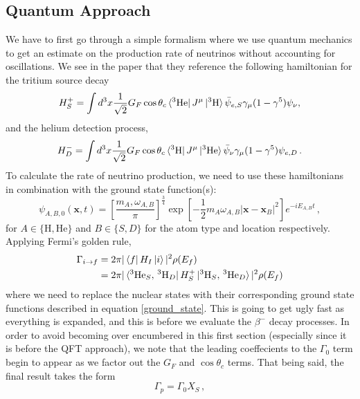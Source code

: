 \documentclass[10pt]{article}
\begin{document}
\subsection{Quantum Approach}
We have to first go through a simple formalism where we use quantum mechanics to get an estimate on the production rate of neutrinos without accounting for oscillations. We see in the paper that they reference the following hamiltonian for the tritium source decay
\begin{equation}
  H_{S}^{+} = \int d^{3}x\frac{1}{\sqrt{2}}G_{F}\cos\theta_{c}\bra{^{3}\textnormal{He}}J^{\mu}\ket{^{3}\textnormal{H}}\bar{\psi}_{e,S}\gamma_{\mu}(1-\gamma^{5})\psi_{\nu},
\end{equation}
and the helium detection process,
\begin{equation}
  H_{D}^{-} = \int d^{3}x\frac{1}{\sqrt{2}}G_{F}\cos\theta_{c}\bra{^{3}\textnormal{H}}J^{\mu}\ket{^{3}\textnormal{He}}\bar{\psi}_{\nu}\gamma_{\mu}(1-\gamma^{5})\psi_{e,D}\, .
\end{equation}
To calculate the rate of neutrino production, we need to use these hamiltonians in combination with the ground state function(s):
\begin{equation}\label{ground_state}
  \psi_{A,B,0}(\bm{x}, t) = \left[\frac{m_{A},\omega_{A,B}}{\pi}\right]^{\frac{3}{4}}\exp\left[-\frac{1}{2}m_{A}\omega_{A,B}|\bm{x} - \bm{x}_{B}|^{2}\right]e^{-iE_{A,B}t}\, ,
\end{equation}
for $A \in \{\text{H}, \text{He}\}$ and $B\in \{S, D\}$ for the atom type and location respectively. Applying Fermi's golden rule,
\begin{align*}
  \Gamma_{i \to f} & = 2\pi|\bra{f}H_{I}\ket{i}|^{2}\rho(E_{f}) \\
  & = 2\pi|\bra{^{3}\text{He}_{S},\, ^{3}\text{H}_{D}}H_{S}^{+}\ket{^{3}\text{H}_{S},\, ^{3}\text{He}_{D}}|^{2}\rho(E_{f})
\end{align*}
where we need to replace the nuclear states with their corresponding ground state functions described in equation \ref{ground_state}. This is going to get ugly fast as everything is expanded, and this is before we evaluate the $\beta^{-}$ decay processes. In order to avoid becoming over encumbered in this first section (especially since it is before the QFT approach), we note that the leading coeffecients to the $\Gamma_{0}$ term begin to appear as we factor out the $G_{F}$ and $\cos\theta_{c}$ terms. That being said, the final result takes the form
\begin{equation}
  \Gamma_{p} = \Gamma_{0}X_{S}\, ,
\end{equation}
\end{document}
